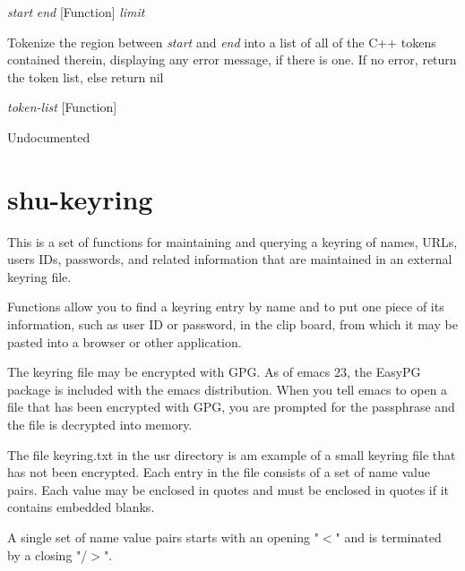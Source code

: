 \vspace{1em}
\noindent
{}
\usebox{\funcname}\emph{start} \emph{end}
 \hfill [Function]
\hspace*{\wd\funcname}\emph{limit}

\begin{doc-string}
Tokenize the region between \emph{start} and \emph{end} into a list of all of the C++
tokens contained therein, displaying any error message, if there is one.  If no
error, return the token list, else return nil
\end{doc-string}

\vspace{1em}
\noindent
{}
\usebox{\funcname}\emph{token-list}
 \hfill [Function]

\begin{doc-string}
Undocumented
\end{doc-string}

\section{shu-keyring}


This is a set of functions for maintaining and querying a keyring of names,
URLs, users IDs, passwords, and related information that are maintained in an
external keyring file.

Functions allow you to find a keyring entry by name and to put one piece of
its information, such as user ID or password, in the clip board, from which it
may be pasted into a browser or other application.

The keyring file may be encrypted with GPG.  As of emacs 23, the EasyPG
package is included with the emacs distribution.  When you tell emacs to open
a file that has been encrypted with GPG, you are prompted for the passphrase
and the file is decrypted into memory.

The file keyring.txt in the usr directory is am example of a small
keyring file that has not been encrypted.  Each entry in the file consists of
a set of name value pairs.  Each value may be enclosed in quotes and must be
enclosed in quotes if it contains embedded blanks.

A single set of name value pairs starts with an opening "$<$" and is terminated
by a closing "/$>$".

